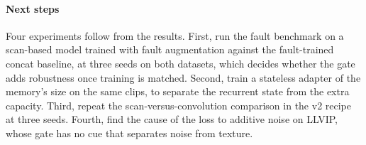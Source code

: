 \paragraph{Next steps}
Four experiments follow from the results. First, run the fault benchmark on a scan-based model trained with fault augmentation against the fault-trained concat baseline, at three seeds on both datasets, which decides whether the gate adds robustness once training is matched. Second, train a stateless adapter of the memory's size on the same clips, to separate the recurrent state from the extra capacity. Third, repeat the scan-versus-convolution comparison in the v2 recipe at three seeds. Fourth, find the cause of the loss to additive noise on LLVIP, whose gate has no cue that separates noise from texture.
